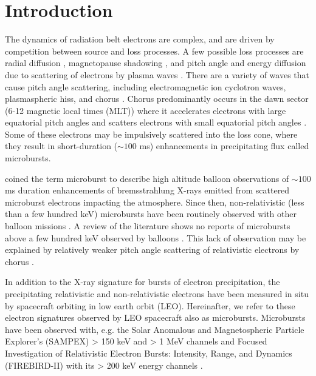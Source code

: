 %
%
\section{Introduction}\label{Intro}
The dynamics of radiation belt electrons are complex, and are driven by competition between source and loss processes. A few possible loss processes are radial diffusion \citep{Shprits2004}, magnetopause shadowing \citep{Ukhorskiy2006}, and pitch angle and energy diffusion due to scattering of electrons by plasma waves \citep[e.g.][]{Abel1998_1, Summers1998, Meredith2002, Selesnick2003, Horne2003, Thorne2005, Mozer2018}. There are a variety of waves that cause pitch angle scattering, including electromagnetic ion cyclotron waves, plasmaspheric hiss, and chorus \citep{Millan2007, Thorne2010}. Chorus predominantly occurs in the dawn sector (6-12 magnetic local times (MLT)) \citep{Li2009} where it accelerates electrons with large equatorial pitch angles and scatters electrons with small equatorial pitch angles \citep{Horne2003}. Some of these electrons may be impulsively scattered into the loss cone, where they result in short-duration ($\sim 100$ ms) enhancements in precipitating flux called microbursts.

\citet{Anderson1964} coined the term microburst to describe high altitude balloon observations of $\sim 100$ ms duration enhancements of bremsstrahlung X-rays emitted from scattered microburst electrons impacting the atmosphere. Since then, non-relativistic (less than a few hundred keV) microbursts have been routinely observed with other balloon missions \citep[e.g.][]{Parks1967, Woodger2015, Anderson2017}. A review of the literature shows no reports of microbursts above a few hundred keV observed by balloons \citep{Millan2002, Woodger2015}. This lack of observation may be explained by relatively weaker pitch angle scattering of relativistic electrons by chorus \citep{Lee2012}. 

In addition to the X-ray signature for bursts of electron precipitation, the precipitating relativistic and non-relativistic electrons have been measured in situ by spacecraft orbiting in low earth orbit (LEO). Hereinafter, we refer to these electron signatures observed by LEO spacecraft also as microbursts. Microbursts have been observed with, e.g. the Solar Anomalous and Magnetospheric Particle Explorer's (SAMPEX) > 150 keV and > 1 MeV channels \citep{Nakamura1995, Nakamura2000, Blake1996, Lorentzen2001a, Lorentzen2001b, O'Brien2003, O'Brien2004, Blum2015} and Focused Investigation of Relativistic Electron Bursts: Intensity, Range, and Dynamics (FIREBIRD-II) with its > 200 keV energy channels \citep{Crew2016, Anderson2017, Breneman2017}.


